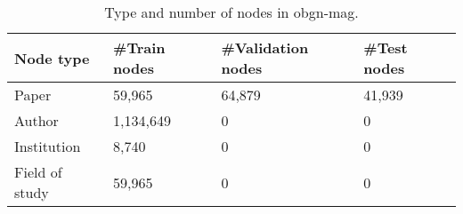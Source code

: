 
\begin{table}[!h]
    \small
        \vspace{-10pt}
        \centering
        \caption{Type and number of nodes in obgn-mag.}
    
        \begin{tabular}{llll}
        \hline
        \multicolumn{1}{l|}{Node   type}                        & \#Train nodes                 & \#Validation nodes  & \#Test nodes \\ \hline
        \multicolumn{1}{l|}{Paper}         & {59,965} & {64,879} & 41,939 \\ \hline
        \multicolumn{1}{l|}{Author}      & {1,134,649} & {0} & 0               \\ \hline
        \multicolumn{1}{l|}{Institution} & {8,740}     & {0} & 0               \\ \hline
        \multicolumn{1}{l|}{Field of study} & {59,965} & {0}      & 0      \\ \hline
        \end{tabular}
        \label{table:node}
    
    \end{table}